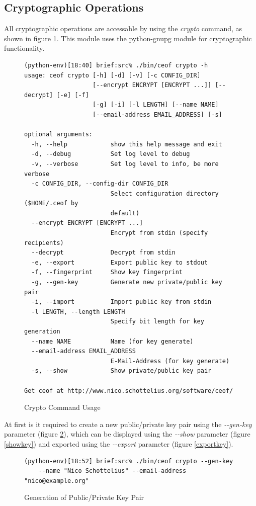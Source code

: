 \subsection{Cryptographic Operations}
All cryptographic operations are accessable by using the \textit{crypto}
command, as shown in figure \ref{cryptohelp}.
This module uses the python-gnupg module for cryptographic functionality.
\begin{figure}[htbp]
\caption{Crypto Command Usage}
\label{cryptohelp}
\begin{verbatim}
(python-env)[18:40] brief:src% ./bin/ceof crypto -h
usage: ceof crypto [-h] [-d] [-v] [-c CONFIG_DIR]
                   [--encrypt ENCRYPT [ENCRYPT ...]] [--decrypt] [-e] [-f]
                   [-g] [-i] [-l LENGTH] [--name NAME]
                   [--email-address EMAIL_ADDRESS] [-s]

optional arguments:
  -h, --help            show this help message and exit
  -d, --debug           Set log level to debug
  -v, --verbose         Set log level to info, be more verbose
  -c CONFIG_DIR, --config-dir CONFIG_DIR
                        Select configuration directory ($HOME/.ceof by
                        default)
  --encrypt ENCRYPT [ENCRYPT ...]
                        Encrypt from stdin (specify recipients)
  --decrypt             Decrypt from stdin
  -e, --export          Export public key to stdout
  -f, --fingerprint     Show key fingerprint
  -g, --gen-key         Generate new private/public key pair
  -i, --import          Import public key from stdin
  -l LENGTH, --length LENGTH
                        Specify bit length for key generation
  --name NAME           Name (for key generate)
  --email-address EMAIL_ADDRESS
                        E-Mail-Address (for key generate)
  -s, --show            Show private/public key pair

Get ceof at http://www.nico.schottelius.org/software/ceof/
\end{verbatim}
\end{figure}
At first is it required to create a new public/private key pair using
the \textit{-{}-gen-key} parameter (figure \ref{genkey}), which can
be displayed using the \textit{-{}-show} parameter (figure \ref{showkey})
and exported using the \textit{-{}-export}
parameter (figure \ref{exportkey}).
\begin{figure}[htbp]
\caption{Generation of Public/Private Key Pair}
\label{genkey}
\begin{verbatim}
(python-env)[18:52] brief:src% ./bin/ceof crypto --gen-key 
    --name "Nico Schottelius" --email-address "nico@example.org"
\end{verbatim}
\end{figure}
